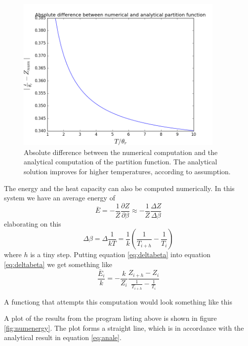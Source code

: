 \documentclass[10pt,a4paper]{amsart}
\begin{document}
\begin{figure}
	\centering
	\includegraphics[width=0.9\textwidth]{figures/numvsanal.png}
	\caption{Absolute difference between the numerical computation and the analytical computation of the partition function. The analytical solution improves for higher temperatures, according to assumption.}
	\label{fig:numvsanal}
\end{figure}

The energy and the heat capacity can also be computed numerically. In this system we have an average energy of
\begin{equation}
\label{eq:numenergy}
\bar{E} = -\frac{1}{Z}\frac{\partial Z}{\partial \beta} \approx -\frac{1}{Z}\frac{\Delta Z}{\Delta \beta}
\end{equation} 
elaborating on this
\begin{equation}
\label{eq:deltabeta}
\Delta \beta = \Delta \frac{1}{kT}= \frac{1}{k}\left(\frac{1}{T_{i+h}}-\frac{1}{T_i} \right)
\end{equation}
where $h$ is a tiny step. Putting equation \ref{eq:deltabeta} into equation \ref{eq:deltabeta} we get something like
\begin{equation}
\frac{\bar{E}_i}{k}=-\frac{k}{Z_i}\frac{Z_{i+h}-Z_i}{\frac{1}{T_{i+h}}-\frac{1}{T_i}}
\end{equation}

A functiong that attempts this computation would look something like this


A plot of the results from the program listing above is shown in figure \ref{fig:numenergy}. The plot forms a straight line, which is in accordance with the analytical result in equation \ref{eq:anale}.
\end{document}
